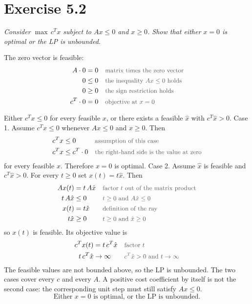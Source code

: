 \documentclass[a4paper,11pt]{article}
\newif\ifexplain
\newcommand{\aufgabe}[1]{\section*{Exercise #1}}
\newcommand{\angabe}[1]{\textit{#1}\par\smallskip}
\newcommand{\why}[1]{\text{\small\color{black!65}#1}}
\newcommand{\explain}[1]{\ifexplain\begin{erklbox}#1\end{erklbox}\fi}
\begin{document}
\aufgabe{5.2}
\angabe{Consider $\max\, c^T x$ subject to $Ax\leq 0$ and $x\geq 0$. Show that either $x=0$ is optimal or the LP is unbounded.}
The zero vector is feasible:
\begin{align*}
A\cdot 0&=0&&\why{matrix times the zero vector}\\
0&\leq 0&&\why{the inequality $Ax\leq 0$ holds}\\
0&\geq 0&&\why{the sign restriction holds}\\
c^T\cdot 0&=0&&\why{objective at $x=0$}
\end{align*}
\explain{Die zulässige Menge ist ein Kegel mit Spitze im Ursprung. Jeder zulässige Punkt darf mit einer nichtnegativen Zahl gestreckt werden, ohne die Nebenbedingungen zu verlassen. Deshalb gibt es nur die beiden Fälle aus der Aufgabe.}
Either $c^T x\leq 0$ for every feasible $x$, or there exists a feasible $\hat x$ with $c^T\hat x>0$.
Case 1. Assume $c^T x\leq 0$ whenever $Ax\leq 0$ and $x\geq 0$. Then
\begin{align*}
c^T x&\leq 0&&\why{assumption of this case}\\
c^T x&\leq c^T\cdot 0&&\why{the right-hand side is the value at zero}
\end{align*}
for every feasible $x$. Therefore $x=0$ is optimal.
Case 2. Assume $\hat x$ is feasible and $c^T\hat x>0$. For every $t\geq 0$ set $x(t)=t\hat x$. Then
\begin{align*}
Ax(t)&=t\,A\hat x&&\why{factor $t$ out of the matrix product}\\
t\,A\hat x&\leq 0&&\why{$t\geq 0$ and $A\hat x\leq 0$}\\
x(t)&=t\hat x&&\why{definition of the ray}\\
t\hat x&\geq 0&&\why{$t\geq 0$ and $\hat x\geq 0$}
\end{align*}
so $x(t)$ is feasible. Its objective value is
\begin{align*}
c^T x(t)&=t\,c^T\hat x&&\why{factor $t$}\\
t\,c^T\hat x&\to\infty&&\why{$c^T\hat x>0$ and $t\to\infty$}
\end{align*}
The feasible values are not bounded above, so the LP is unbounded.
The two cases cover every $c$ and every $A$. A positive cost coefficient by itself is not the second case: the corresponding unit step must still satisfy $Ax\leq 0$.
\[\boxed{\text{Either }x=0\text{ is optimal, or the LP is unbounded.}}\]
\explain{Der häufige Fehlschluss ist, aus einem positiven $c_j$ sofort Unbeschränktheit zu lesen. Das stimmt nur, wenn die Spalte $A_{\cdot j}$ selbst keine positive Komponente hat, denn nur dann bleibt $t e_j$ zulässig. Hat die Spalte einen positiven Eintrag, blockiert diese Zeile schon jeden positiven Schritt, und $x=0$ kann trotzdem optimal sein. Der Beweis benutzt deshalb einen tatsächlich zulässigen Punkt mit positivem Wert und streckt genau diesen. Positives $c_j$ allein reicht nicht.}
\end{document}

